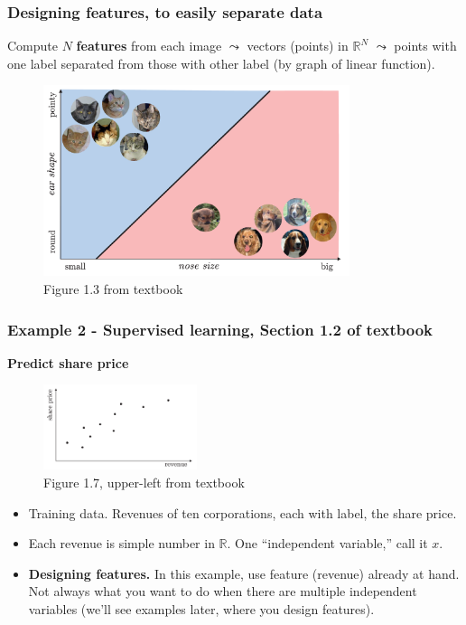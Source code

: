 \documentclass{beamer}
\theoremstyle{example}
\newcommand{\bb}[1]{\mathbb{#1}}
\begin{document}
\begin{frame}
    \frametitle{Designing features, to easily separate data}
    Compute $N$ \textbf{features} from each image $\leadsto$ vectors (points) in $\bb R^N$ $\leadsto$ points with one label separated from those with other label (by graph of linear function).

    \begin{figure}
        \includegraphics[width=0.8\textwidth]{../../Images/Fig1-3.png}
    \caption*{Figure 1.3 from textbook}
    \end{figure}
\end{frame}

\begin{frame}
\frametitle{Example 2 - Supervised learning, Section 1.2 of textbook}
\textbf{Predict share price}

\begin{figure}
\includegraphics[width=0.4\textwidth]{../../Images/Fig1-7a.png}
\caption*{Figure 1.7, upper-left from textbook}
\end{figure}

\begin{itemize}
    \item Training data. Revenues of ten corporations, each with label, the share price.
    \item Each revenue is simple number in $\bb R$. One ``independent variable,'' call it $x$.
    \item \textbf{Designing features.} In this example, use feature (revenue) already at hand. Not always what you want to do when there are multiple independent variables (we'll see examples later, where you design features).
\end{itemize}
\end{frame}
\end{document}
